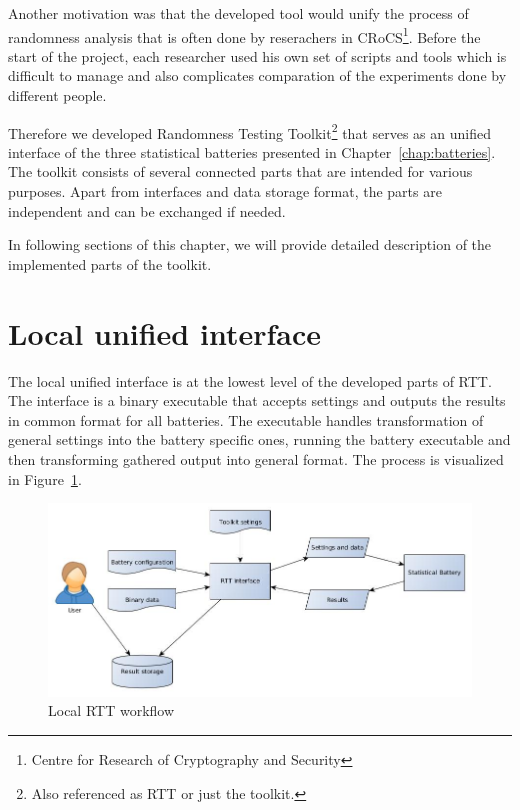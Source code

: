 \documentclass[
  digital,  	%
  color,		%
  oneside,   	%
  12pt,
  nocover,
  notable,
  nolof,
  nolot,
]{fithesis3}
\begin{document}
Another motivation was that the developed tool would unify the process of randomness analysis that is often done by reserachers in CRoCS\footnote{Centre for Research of Cryptography and Security}. Before the start of the project, each researcher used his own set of scripts and tools which is difficult to manage and also complicates comparation of the experiments done by different people.

Therefore we developed Randomness Testing Toolkit\footnote{Also referenced as RTT or just the toolkit.} that serves as an unified interface of the three statistical batteries presented in Chapter~\ref{chap:batteries}. The toolkit consists of several connected parts that are intended for various purposes. Apart from interfaces and data storage format, the parts are independent and can be exchanged if needed.

In following sections of this chapter, we will provide detailed description of the implemented parts of the toolkit.

\section{Local unified interface}
The local unified interface is at the lowest level of the developed parts of RTT. The interface is a binary executable that accepts settings and outputs the results in common format for all batteries. The executable handles transformation of general settings into the battery specific ones, running the battery executable and then transforming gathered output into general format. The process is visualized in Figure~\ref{fig:rtt_local_workflow}.

\begin{figure}[h!]
\begin{nomar}
\centering
\includegraphics[width=\paperwidth-4cm]{figures/local-rtt-workflow.jpg}
\end{nomar}
\caption{Local RTT workflow}
\label{fig:rtt_local_workflow}
\end{figure}
\end{document}
